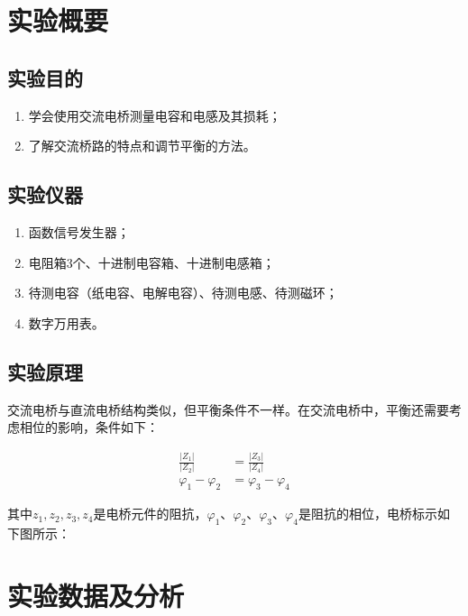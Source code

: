 \documentclass[a4paper]{article}
\begin{document}


\section{实验概要}
\subsection{实验目的}
\begin{enumerate}
    \item 学会使用交流电桥测量电容和电感及其损耗；
    \item 了解交流桥路的特点和调节平衡的方法。
\end{enumerate}

%
\subsection{实验仪器}
\begin{enumerate}
    \item 函数信号发生器；
    \item 电阻箱3个、十进制电容箱、十进制电感箱；
    \item 待测电容（纸电容、电解电容）、待测电感、待测磁环；
    \item 数字万用表。
\end{enumerate}


\subsection{实验原理}
\hspace{2em}交流电桥与直流电桥结构类似，但平衡条件不一样。在交流电桥中，平衡还需要考虑相位的影响，条件如下：\par
\begin{align*}
    \frac{|Z_1|}{|Z_2|} & =\frac{|Z_3|}{|Z_4|} \\
    \varphi_1-\varphi_2 & =\varphi_3-\varphi_4
\end{align*}
\hspace{2em}  \par

其中$z_1,z_2,z_3,z_4$是电桥元件的阻抗，$\varphi_1、\varphi_2、\varphi_3、\varphi_4$是阻抗的相位，电桥标示如下图所示：

\section{实验数据及分析}

\end{document}
